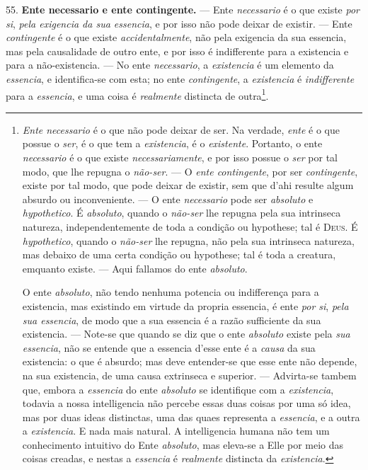 55. \textbf{Ente necessario e ente contingente.} --- Ente \emph{necessario} é o que existe \emph{por si}, \emph{pela exigencia da sua essencia}, e por isso não pode deixar de existir. --- Ente \emph{contingente} é o que existe \emph{accidentalmente}, não pela exigencia da sua essencia, mas pela causalidade de outro ente, e por isso é indifferente para a  existencia e para a não-existencia. --- No ente \emph{necessario}, a \emph{existencia} é um elemento da \emph{essencia}, e identifica-se com esta; no ente \emph{contingente}, a \emph{existencia} é \emph{indifferente} para a \emph{essencia}, e uma coisa é \emph{realmente} distincta de outra\footnote{\emph{Ente necessario} é o que não pode deixar de ser. Na verdade, \emph{ente} é o que possue o \emph{ser}, é o que tem a \emph{existencia}, é o \emph{existente}. Portanto, o ente \emph{necessario} é o que existe \emph{necessariamente}, e por isso possue o \emph{ser} por tal modo, que lhe repugna o \emph{não-ser}. --- O \emph{ente contingente}, por ser \emph{contingente}, existe por tal modo, que pode deixar de existir, sem que d'ahi resulte algum absurdo ou inconveniente. --- O ente \emph{necessario} pode ser \emph{absoluto} e \emph{hypothetico}. É \emph{absoluto}, quando o \emph{não-ser} lhe repugna pela sua intrinseca natureza, independentemente de toda a condição ou hypothese; tal é \textsc{Deus}. É \emph{hypothetico}, quando o \emph{não-ser} lhe repugna, não pela sua intrinseca natureza, mas debaixo de uma certa condição ou hypothese; tal é toda a creatura, emquanto existe. --- Aqui fallamos do ente \emph{absoluto}.\par O ente \emph{absoluto}, não tendo nenhuma potencia ou indifferença para a existencia, mas existindo em virtude da propria essencia, é ente \emph{por si}, \emph{pela sua essencia}, de modo que a sua essencia é a razão sufficiente da sua existencia. --- Note-se que quando se diz que o ente \emph{absoluto} existe pela \emph{sua essencia}, não se entende que a essencia d'esse ente é a \emph{causa} da sua existencia: o que é absurdo; mas deve entender-se que esse ente não depende, na sua existencia, de uma causa extrinseca e superior. --- Advirta-se tambem que, embora a \emph{essencia} do ente \emph{absoluto} se identifique com a \emph{existencia}, todavia a nossa intelligencia não percebe essas duas coisas por uma só idea, mas por duas ideas distinctas, uma das quaes representa a \emph{essencia}, e a outra a \emph{existencia}. E nada mais natural. A intelligencia humana não tem um conhecimento intuitivo do Ente \emph{absoluto}, mas eleva-se a Elle por meio das coisas creadas, e nestas a \emph{essencia} é \emph{realmente} distincta da \emph{existencia}.}.

